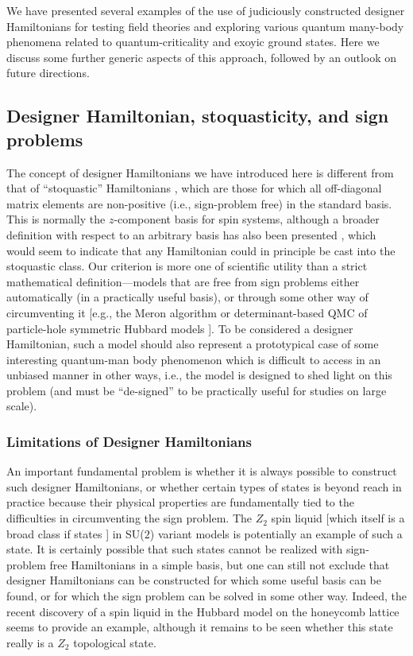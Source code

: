\documentclass[range]{ar2e}
\begin{document}
We have presented several examples of the use of judiciously constructed designer Hamiltonians for testing field theories
and exploring various quantum many-body phenomena related to quantum-criticality and exoyic ground states. Here we discuss some further 
generic aspects of this approach, followed by an outlook on future directions.

\subsection{Designer Hamiltonian, stoquasticity, and sign problems}

The concept of designer Hamiltonians we have introduced here is different from that of ``stoquastic'' Hamiltonians \cite{Terhal08}, which are
those for which all off-diagonal matrix elements are non-positive (i.e., sign-problem free) in the standard basis.  This is normally the  $z$-component 
basis for spin systems, although a broader definition with respect to an arbitrary basis has also been presented \cite{Terhal09}, which would seem to 
indicate that any Hamiltonian could in principle be cast into the stoquastic class. Our criterion is more one of scientific utility than a strict mathematical 
definition---models that are free from sign problems either automatically (in a practically useful basis), or through some 
other way of circumventing it [e.g., the Meron algorithm \cite{Chandrasekharan99} or determinant-based QMC of particle-hole symmetric Hubbard 
models \cite{White89,Assaad05,Assaad07}]. To be considered a designer Hamiltonian, such a model should also represent a prototypical case of 
some interesting quantum-man body phenomenon which is difficult to access in an unbiased manner in other ways, i.e., the model is designed to shed
light on this problem (and must be ``de-signed'' to be practically useful for studies on large scale).

\subsubsection{Limitations of Designer Hamiltonians}

An important fundamental problem is whether it is always possible to construct such designer Hamiltonians, or whether certain types of 
states is beyond reach in practice because their physical properties are fundamentally tied to the difficulties in circumventing the sign problem. 
The $Z_2$ spin liquid [which itself is a broad class if states \cite{Wen03}] in SU($2$) variant models is potentially an example of such a state. 
It is certainly possible that such states cannot be realized with sign-problem free Hamiltonians in a simple basis, but one can still not exclude that 
designer Hamiltonians can be constructed for which some useful basis can be found, or for which the sign problem can be solved in some other way.
Indeed, the recent discovery of a spin liquid in the Hubbard model on the honeycomb lattice \cite{Meng10} seems to provide an example, although it 
remains to be seen whether this state really is a $Z_2$ topological state.
\end{document}
